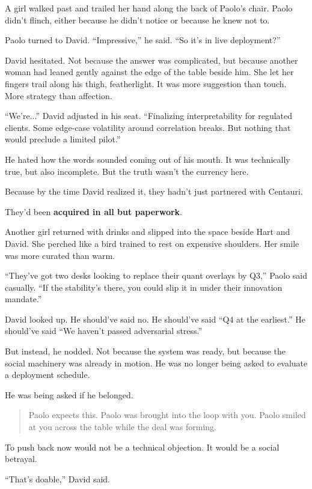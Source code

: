 A girl walked past and trailed her hand along the back of Paolo’s chair. Paolo didn’t flinch, either because he didn’t 
notice or because he knew not to.

Paolo turned to David. “Impressive,” he said. “So it’s in live deployment?”

David hesitated. Not because the answer was complicated, but because another woman had leaned gently against the edge 
of the table beside him. She let her fingers trail along his thigh, featherlight. It was more suggestion than touch. 
More strategy than affection.

“We’re...” David adjusted in his seat. “Finalizing interpretability for regulated clients. Some edge-case volatility 
around correlation breaks. But nothing that would preclude a limited pilot.”

He hated how the words sounded coming out of his mouth. It was technically true, but also incomplete. But the truth 
wasn’t the currency here.

Because by the time David realized it, they hadn’t just partnered with Centauri.

They’d been \textbf{acquired in all but paperwork}.

Another girl returned with drinks and slipped into the space beside Hart and David. She perched like a bird trained to rest on 
expensive shoulders. Her smile was more curated than warm.

“They’ve got two desks looking to replace their quant overlays by Q3,” Paolo said casually. “If the stability’s there, 
you could slip it in under their innovation mandate.”

David looked up. He should’ve said no. He should’ve said “Q4 at the earliest.” He should’ve said “We haven’t passed 
adversarial stress.”

But instead, he nodded. Not because the system was ready, but because the social machinery was already in motion. 
He was no longer being asked to evaluate a deployment schedule.

He was being asked if he belonged.

\begin{quote}
Paolo expects this. Paolo was brought into the loop with you. Paolo smiled at you across the table while the 
deal was forming.
\end{quote}

To push back now would not be a technical objection. It would be a social betrayal.

“That’s doable,” David said.

